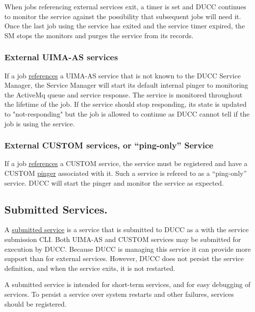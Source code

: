       When jobs referencing external services exit, a timer is set and DUCC continues to monitor the
      service against the possibility that subsequent jobs will need it. Once the last job using the
      service has exited and the service timer expired, the SM stops the monitors and purges the
      service from its records.

      \subsubsection{External UIMA-AS services}
      If a job \hyperref[sec:service.endpoints]{references} a UIMA-AS service that is not known to the
      DUCC Service Manager, the Service Manager will start
      its default internal pinger to monitoring the ActiveMq queue and service response.  The
      service is monitored throughout the lifetime of the job. If the service should stop
      responding, its state is updated to "not-responding" but the job is allowed to continue as
      DUCC cannot tell if the job is using the service.

      \subsubsection{External CUSTOM services, or ``ping-only'' Service} 
      If a job \hyperref[sec:service.endpoints]{references} a CUSTOM service, the service must be
      registered and have a CUSTOM \hyperref[sec:service.pingers]{pinger} associated with it. Such a
      service is refered to as a ``ping-only'' service.  DUCC will start the pinger and monitor the
      service as expected.
      
      
      \subsection{Submitted Services.} A \hyperref[sec:cli.service-submit]{submitted service} is a
      service that is submitted to DUCC as a with the service submission CLI.  Both UIMA-AS and
      CUSTOM services may be submitted for execution by DUCC. Because DUCC is managing this service
      it can provide more support than for external services.  However, DUCC does not persist the
      service definition, and when the service exits, it is not restarted.

      A submitted service is intended for short-term services, and for easy debugging of services.
      To persist a service over system restarts and other failures, services should be registered.
      
